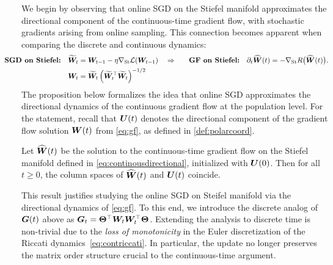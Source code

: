 We begin by observing that online SGD on the Stiefel manifold approximates the directional component of the continuous-time gradient flow, with stochastic gradients arising from online sampling. This connection becomes apparent when comparing the discrete and continuous dynamics:
\begin{alignat}{2}
\hspace{-2.4em} \textbf{SGD on Stiefel:} ~~~
& \bs{\widetilde{W}}_{t} = \bs{W}_{t-1} - \eta \nabla_{\mathrm{St}} \mathcal{L}(\bs{W}_{t-1}) \quad \Rightarrow \quad
&& \textbf{GF on Stiefel:} ~~~
  \partial_t \widehat{\W}(t) = -\nabla_{\mathrm{St}} R\big( \widehat{\W}(t) \big).   \label{eq:continousdirectional} \\
& \bs{W}_{t} = \bs{\widetilde{W}}_{t} \left( \bs{\widetilde{W}}_{t}^\top \bs{\widetilde{W}}_{t} \right)^{-1/2}
\ && 
\end{alignat}
The proposition below formalizes the idea that online SGD approximates the directional dynamics of the continuous gradient flow at the population level. For the statement, recall that $\boldsymbol{U}(t)$ denotes the directional component of the gradient flow solution $\boldsymbol{W}(t)$ from \eqref{eq:gf}, as defined in \eqref{def:polarcoord}. 
\begin{proposition}
\label{prop:sgdrotation}
Let $\widehat{\boldsymbol{W}}(t)$ be the solution to the continuous-time gradient flow on the Stiefel manifold defined in \eqref{eq:continousdirectional}, initialized with $\boldsymbol{U}(0)$. Then for all $t \geq 0$, the column spaces of $\widehat{\boldsymbol{W}}(t)$ and $\boldsymbol{U}(t)$ coincide.
\end{proposition}

This result justifies studying the online SGD on Steifel manifold via the directional dynamics of \eqref{eq:gf}.
 To this end, we introduce the discrete analog of $\boldsymbol{G}(t)$ above as $\boldsymbol{G}_t = \boldsymbol{\Theta}^\top \boldsymbol{W}_t \boldsymbol{W}_t^\top \boldsymbol{\Theta}$. Extending the analysis to discrete time is non-trivial due to the \emph{loss of monotonicity} in the Euler discretization of the Riccati dynamics~\eqref{eq:contriccati}. In particular, the update
no longer preserves the matrix order structure crucial to the continuous-time argument.


